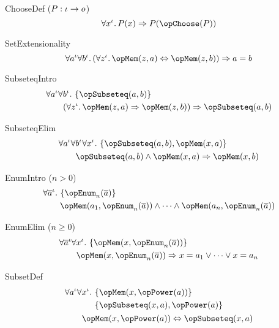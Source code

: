 \documentclass[11pt, a4paper, oneside]{article}
\begin{document}
\begin{axioms}
\item[ChooseDef ($P : \iota \rightarrow o$)] \[
        \forall x^\idv.\, P(x) \imp P(\opChoose(P))
    \]

\item[SetExtensionality] \[
        \forall a^\idv \forall b^\idv.\, (\forall z^\idv.\, \opMem(z, a) \eqv \opMem(z, b)) \imp a = b
    \]

\item[SubseteqIntro] \[
        \begin{aligned}
            &\forall a^\idv \forall b^\idv.\, \st{ \opSubseteq(a, b) } \\
            &\qquad (\forall z^\idv.\, \opMem(z, a) \imp \opMem(z, b)) \imp \opSubseteq(a, b)
        \end{aligned}
    \]

\item[SubseteqElim] \[
        \begin{aligned}
            &\forall a^\idv \forall b^\idv \forall x^\idv.\, \st{ \opSubseteq(a, b), \opMem(x, a) } \\
            &\qquad \opSubseteq(a, b) \wedge \opMem(x, a) \imp \opMem(x, b)
        \end{aligned}
    \]

\item[EnumIntro ($n > 0$)] \[
        \begin{aligned}
            &\forall \overline{a}^\idv.\, \st{ \opEnum_n(\overline{a}) } \\
            &\qquad \opMem(a_1, \opEnum_n(\overline{a})) \wedge \dots \wedge \opMem(a_n, \opEnum_n(\overline{a}))
        \end{aligned}
    \]

\item[EnumElim ($n \ge 0$)] \[
        \begin{aligned}
            &\forall \overline{a}^\idv \forall x^\idv.\, \st{ \opMem(x, \opEnum_n(\overline{a})) } \\
            &\qquad \opMem(x, \opEnum_n(\overline{a})) \imp x = a_1 \vee \dots \vee x = a_n
        \end{aligned}
    \]

\item[SubsetDef] \[
        \begin{aligned}
            &\forall a^\idv \forall x^\idv.\, \begin{aligned}[t]
                &\st{ \opMem(x, \opPower(a)) } \\
                &\st{ \opSubseteq(x, a), \opPower(a) }
            \end{aligned} \\
            &\qquad \opMem(x, \opPower(a)) \eqv \opSubseteq(x, a)
        \end{aligned}
    \]


\end{axioms}
\end{document}
